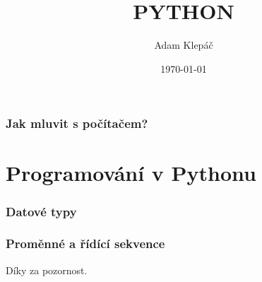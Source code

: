 \documentclass[aspectratio=169,11pt]{beamer}
\title{PYTHON}
\date{\today}
\author{Adam Klepáč}
\institute[GEVO]{Gymnázium Evolution Jižní Město}
\begin{document}
\maketitle

\section[Programovací jazyky]{Jak mluvit s počítačem?}

\begin{frame}[plain]
 \sectionpage
\end{frame}



\part[Programování v Pythonu]{Programování v Pythonu}

\begin{frame}[plain]
 \partpage
\end{frame}

\section[Datové typy]{Datové typy}

\begin{frame}[plain]
 \sectionpage
\end{frame}



\section[Proměnné a řídící sekvence]{Proměnné a řídící sekvence}

\begin{frame}[plain]
 \sectionpage
\end{frame}



\begin{frame}[plain]
 \centering\Huge Díky za pozornost.
\end{frame}
\end{document}
